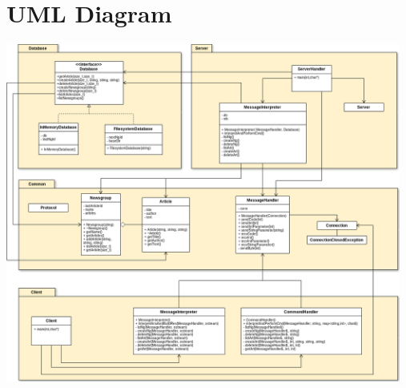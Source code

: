 \documentclass[a4paper, titlepage]{article}
\begin{document}
\newpage
\appendix
\section{UML Diagram}\label{App:AppendixA}
\includegraphics[width=130mm]{NewsNet_UML.png}
\end{document}
